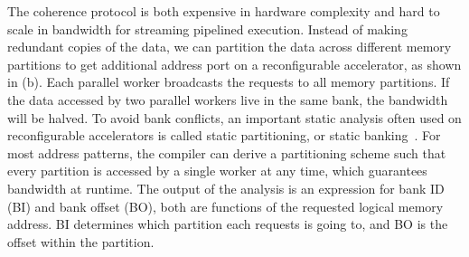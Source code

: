 The coherence protocol is both expensive in hardware complexity and hard to scale in bandwidth for
streaming pipelined execution.
Instead of making redundant copies of the data, we can partition the data across different memory
partitions to get additional address port on a reconfigurable accelerator, as shown in
 (b).
Each parallel worker broadcasts the requests to all memory partitions.
If the data accessed by two parallel workers live in the same bank, the bandwidth will be halved.
To avoid bank conflicts, an important static analysis often used on reconfigurable accelerators 
is called static partitioning, or static banking~\cite{poly_cong}.
For most address patterns, the compiler can derive a partitioning scheme such that every partition is accessed by a
single worker at any time, which guarantees bandwidth at runtime.
The output of the analysis is an expression for bank ID (BI) and bank offset (BO), both are
functions of the requested logical memory address.
BI determines which partition each requests is going to, and BO is the offset within the
partition.

